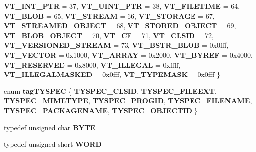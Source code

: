 \begin{DoxyCompactItemize}
{\bfseries V\+T\+\_\+\+I\+N\+T\+\_\+\+P\+TR} = 37, 
{\bfseries V\+T\+\_\+\+U\+I\+N\+T\+\_\+\+P\+TR} = 38, 
{\bfseries V\+T\+\_\+\+F\+I\+L\+E\+T\+I\+ME} = 64, 
{\bfseries V\+T\+\_\+\+B\+L\+OB} = 65, 
\newline
{\bfseries V\+T\+\_\+\+S\+T\+R\+E\+AM} = 66, 
{\bfseries V\+T\+\_\+\+S\+T\+O\+R\+A\+GE} = 67, 
{\bfseries V\+T\+\_\+\+S\+T\+R\+E\+A\+M\+E\+D\+\_\+\+O\+B\+J\+E\+CT} = 68, 
{\bfseries V\+T\+\_\+\+S\+T\+O\+R\+E\+D\+\_\+\+O\+B\+J\+E\+CT} = 69, 
\newline
{\bfseries V\+T\+\_\+\+B\+L\+O\+B\+\_\+\+O\+B\+J\+E\+CT} = 70, 
{\bfseries V\+T\+\_\+\+CF} = 71, 
{\bfseries V\+T\+\_\+\+C\+L\+S\+ID} = 72, 
{\bfseries V\+T\+\_\+\+V\+E\+R\+S\+I\+O\+N\+E\+D\+\_\+\+S\+T\+R\+E\+AM} = 73, 
\newline
{\bfseries V\+T\+\_\+\+B\+S\+T\+R\+\_\+\+B\+L\+OB} = 0x0fff, 
{\bfseries V\+T\+\_\+\+V\+E\+C\+T\+OR} = 0x1000, 
{\bfseries V\+T\+\_\+\+A\+R\+R\+AY} = 0x2000, 
{\bfseries V\+T\+\_\+\+B\+Y\+R\+EF} = 0x4000, 
\newline
{\bfseries V\+T\+\_\+\+R\+E\+S\+E\+R\+V\+ED} = 0x8000, 
{\bfseries V\+T\+\_\+\+I\+L\+L\+E\+G\+AL} = 0xffff, 
{\bfseries V\+T\+\_\+\+I\+L\+L\+E\+G\+A\+L\+M\+A\+S\+K\+ED} = 0x0fff, 
{\bfseries V\+T\+\_\+\+T\+Y\+P\+E\+M\+A\+SK} = 0x0fff
 \}
\item 
\mbox{\label{interface_i_win_types_a252388eb315e13a015dda17ac89695c0}} 
enum {\bfseries tag\+T\+Y\+S\+P\+EC} \{ \newline
{\bfseries T\+Y\+S\+P\+E\+C\+\_\+\+C\+L\+S\+ID}, 
{\bfseries T\+Y\+S\+P\+E\+C\+\_\+\+F\+I\+L\+E\+E\+XT}, 
{\bfseries T\+Y\+S\+P\+E\+C\+\_\+\+M\+I\+M\+E\+T\+Y\+PE}, 
{\bfseries T\+Y\+S\+P\+E\+C\+\_\+\+P\+R\+O\+G\+ID}, 
\newline
{\bfseries T\+Y\+S\+P\+E\+C\+\_\+\+F\+I\+L\+E\+N\+A\+ME}, 
{\bfseries T\+Y\+S\+P\+E\+C\+\_\+\+P\+A\+C\+K\+A\+G\+E\+N\+A\+ME}, 
{\bfseries T\+Y\+S\+P\+E\+C\+\_\+\+O\+B\+J\+E\+C\+T\+ID}
 \}
\item 
\mbox{\label{interface_i_win_types_a7089e278b60d2393cea0bc5c0d5d8a80}} 
typedef unsigned char {\bfseries B\+Y\+TE}
\item 
\mbox{\label{interface_i_win_types_a82db4de5947b2bdd68170ab96b07b198}} 
typedef unsigned short {\bfseries W\+O\+RD}
\item 
\mbox{\label{interface_i_win_types_ac84c43f80b0a1d63e6a5db270682dfa1}} 

\end{DoxyCompactItemize}
